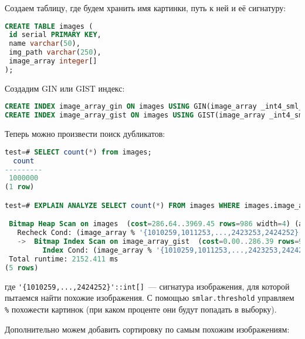 Создаем таблицу, где будем хранить имя картинки, путь к ней и её сигнатуру:

\begin{lstlisting}[language=SQL,label=lst:smlar8,caption=Таблица для изображений]
CREATE TABLE images (
 id serial PRIMARY KEY,
 name varchar(50),
 img_path varchar(250),
 image_array integer[]
);
\end{lstlisting}

Создадим GIN или GIST индекс:

\begin{lstlisting}[language=SQL,label=lst:smlar9,caption=Создание GIN или GIST индекса]
CREATE INDEX image_array_gin ON images USING GIN(image_array _int4_sml_ops);
CREATE INDEX image_array_gist ON images USING GIST(image_array _int4_sml_ops);
\end{lstlisting}

Теперь можно произвести поиск дубликатов:

\begin{lstlisting}[language=SQL,label=lst:smlar10,caption=Поиск дубликатов]
test=# SELECT count(*) from images;
  count
---------
 1000000
(1 row)

test=# EXPLAIN ANALYZE SELECT count(*) FROM images WHERE images.image_array % '{1010259,1011253,...,2423253,2424252}'::int[];

 Bitmap Heap Scan on images  (cost=286.64..3969.45 rows=986 width=4) (actual time=504.312..2047.533 rows=200000 loops=1)
   Recheck Cond: (image_array % '{1010259,1011253,...,2423253,2424252}'::integer[])
   ->  Bitmap Index Scan on image_array_gist  (cost=0.00..286.39 rows=986 width=0) (actual time=446.109..446.109 rows=200000 loops=1)
         Index Cond: (image_array % '{1010259,1011253,...,2423253,2424252}'::integer[])
 Total runtime: 2152.411 ms
(5 rows)
\end{lstlisting}

где \lstinline!'{1010259,...,2424252}'::int[]!~--- сигнатура изображения, для которой пытаемся найти похожие изображения. С помощью \lstinline!smlar.threshold! управляем \lstinline!%! похожести картинок (при каком проценте они будут попадать в выборку).

Дополнительно можем добавить сортировку по самым похожим изображениям:

